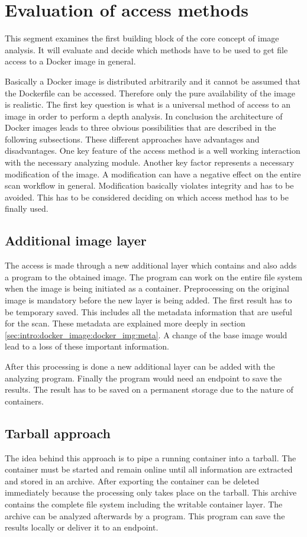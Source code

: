 \section{Evaluation of access methods}
\label{ch:theory:access_eval}
This segment examines the first building block of the core concept of image analysis.
It will evaluate and decide which methods have to be used to get file access to a Docker image in general.

Basically a Docker image is distributed arbitrarily and it cannot be assumed that the Dockerfile can be accessed.
Therefore only the pure availability of the image is realistic.
The first key question is what is a universal method of access to an image in order to perform a depth analysis.
In conclusion the architecture of Docker images leads to three obvious possibilities that are described in the following subsections.
These different approaches have advantages and disadvantages.
One key feature of the access method is a well working interaction with the necessary analyzing module.
Another key factor represents a necessary modification of the image. 
A modification can have a negative effect on the entire scan workflow in general.
Modification basically violates integrity and has to be avoided.
This has to be considered deciding on which access method has to be finally used.

\subsection{Additional image layer} 
\label{ch:theory:access_eval:additional}
The access is made through a new additional layer which contains and also adds a program to the obtained image. 
The program can work on the entire file system when the image is being initiated as a container.
Preprocessing on the original image is mandatory before the new layer is being added. 
The first result has to be temporary saved. 
This includes all the metadata information that are useful for the scan. 
These metadata are explained more deeply in section \ref{sec:intro:docker_image:docker_img:meta}. 
A change of the base image would lead to a loss of these important information.

After this processing is done a new additional layer can be added with the analyzing program.
Finally the program would need an endpoint to save the results. 
The result has to be saved on a permanent storage due to the nature of containers.

\subsection{Tarball approach} 
\label{ch:theory:access_eval:tarball}
The idea behind this approach is to pipe a running container into a tarball. The container must be started and remain online until all information are extracted and stored in an archive.
After exporting the container can be deleted immediately because the processing only takes place on the tarball.
This archive contains the complete file system including the writable container layer. The archive can be analyzed afterwards by a program. This program can save the results locally or deliver it to an endpoint.

